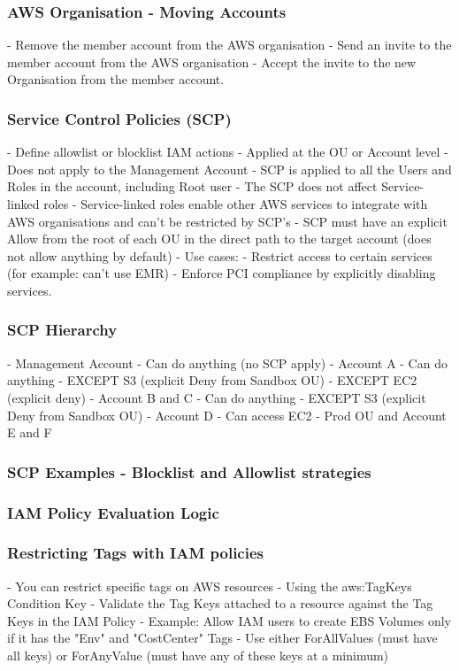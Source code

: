 \documentclass[11pt]{book}
\begin{document}
    \subsubsection{AWS Organisation - Moving Accounts}
    - Remove the member account from the AWS organisation
    - Send an invite to the member account from the AWS organisation
    - Accept the invite to the new Organisation from the member account.

    \subsubsection{Service Control Policies (SCP)}
    - Define allowlist or blocklist IAM actions
    - Applied at the OU or Account level
    - Does not apply to the Management Account
    - SCP is applied to all the Users and Roles in the account, including Root user
    - The SCP does not affect Service-linked roles
    - Service-linked roles enable other AWS services to integrate with AWS organisations and can't be restricted by SCP's
    - SCP must have an explicit Allow from the root of each OU in the direct path to the target account (does not allow anything by default)
    - Use cases:
    - Restrict access to certain services (for example: can't use EMR)
    - Enforce PCI compliance by explicitly disabling services.

    \subsubsection{SCP Hierarchy}
    - Management Account - Can do anything (no SCP apply)
    - Account A
    - Can do anything
    - EXCEPT S3 (explicit Deny from Sandbox OU)
    - EXCEPT EC2 (explicit deny)
    - Account B and C
    - Can do anything
    - EXCEPT S3 (explicit Deny from Sandbox OU)
    - Account D
    - Can access EC2
    - Prod OU and Account E and F

    \subsubsection{SCP Examples - Blocklist and Allowlist strategies}

    \subsubsection{IAM Policy Evaluation Logic}

    \subsubsection{Restricting Tags with IAM policies}
    - You can restrict specific tags on AWS resources
    - Using the aws:TagKeys Condition Key
    - Validate the Tag Keys attached to a resource against the Tag Keys in the IAM Policy
    - Example: Allow IAM users to create EBS Volumes only if it has the "Env" and "CostCenter" Tags
    - Use either ForAllValues (must have all keys) or ForAnyValue (must have any of these keys at a minimum)
\end{document}
